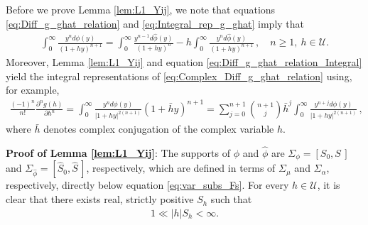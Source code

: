 \documentclass[english,12pt,jmp,graphicx]{revtex4-1}
\newcommand{\ph}{\hat{\phi}}
\begin{document}
Before we prove Lemma \ref{lem:L1_Yij}, we note that equations
\eqref{eq:Diff_g_ghat_relation} and \eqref{eq:Integral_rep_g_ghat}
imply that
%
\begin{align}\label{eq:Diff_g_ghat_relation_Integral}
  \int_0^\infty \frac{y^nd\phi(y)}{(1+hy)^{n+1}}=\int_0^\infty\frac{y^{n-1}d\ph(y)}{(1+hy)^n} 
                                -h \int_0^\infty\frac{y^nd\ph(y)}{(1+hy)^{n+1}}
  \,, \quad   n\geq1, \ h\in\mathcal{U}.               
\end{align}
%
Moreover, Lemma \ref{lem:L1_Yij} and equation
\eqref{eq:Diff_g_ghat_relation_Integral} yield the integral
representations of \eqref{eq:Complex_Diff_g_ghat_relation} using, for
example, 
%
\begin{align}\label{eq:Complex_Diff_g}
  \frac{(-1)^n}{n!}\frac{\partial^ng(h)}{\partial h^n}
   =\int_0^\infty\frac{y^nd\phi(y)}{|1+hy|^{2(n+1)}}(1+\bar{h}y)^{n+1}
   =\sum_{j=0}^{n+1}{n+1 \choose j}\bar{h}^j
                 \int_0^\infty\frac{y^{n+j}d\phi(y)}{|1+hy|^{2(n+1)}}\,,               
\end{align}
%
where $\bar{h}$ denotes complex conjugation of the complex variable $h$.

\textbf{Proof of Lemma \ref{lem:L1_Yij}}:
%
The supports of $\phi$ and $\ph$ are $\Sigma_\phi=[S_0,S\,]$ and
$\Sigma_{\ph}=[\hat{S}_0,\hat{S}\,]$, respectively, which are defined in
terms of $\Sigma_\mu$ and $\Sigma_\alpha$, respectively, directly below equation
\eqref{eq:var_subs_Fs}. For every $h\in\mathcal{U}$, it is clear that
there exists real, strictly positive $S_h$ such that   
%
\begin{align}\label{eq:S1_asymp}
  1\ll|h|S_h<\infty.
\end{align}
%
\end{document}
